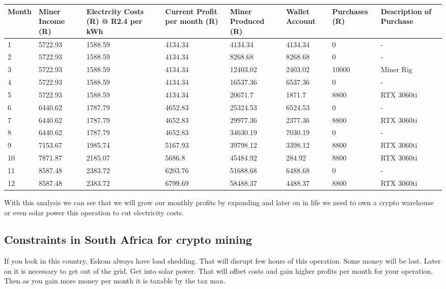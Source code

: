 \begin{table}[H]    
    \begin{tabular}{|p{1cm}|p{1.4cm}||p{1.3cm}||p{2cm}||p{2cm}||p{2cm}||p{2cm}||p{3cm}|}
    \hline
        Month & Miner Income (R) & Electrcity Costs (R) @ R2.4 per kWh & Current Profit per month (R) & Miner Produced (R) & Wallet Account & Purchases (R) & Description of Purchase \\ \hline
        1 & 5722.93 & 1588.59 & 4134.34 & 4134.34 & 4134.34 & 0 & - \\ \hline
        2 & 5722.93 & 1588.59 & 4134.34 & 8268.68 & 8268.68 & 0 & - \\ \hline
        3 & 5722.93 & 1588.59 & 4134.34 & 12403.02 & 2403.02 & 10000 & Miner Rig \\ \hline
        4 & 5722.93 & 1588.59 & 4134.34 & 16537.36 & 6537.36 & 0 & - \\ \hline
        5 & 5722.93 & 1588.59 & 4134.34 & 20671.7 & 1871.7 & 8800 & RTX 3060ti \\ \hline
        6 & 6440.62 & 1787.79 & 4652.83 & 25324.53 & 6524.53 & 0 & - \\ \hline
        7 & 6440.62 & 1787.79 & 4652.83 & 29977.36 & 2377.36 & 8800 & RTX 3060ti \\ \hline
        8 & 6440.62 & 1787.79 & 4652.83 & 34630.19 & 7030.19 & 0 & - \\ \hline
        9 & 7153.67 & 1985.74 & 5167.93 & 39798.12 & 3398.12 & 8800 & RTX 3060ti \\ \hline
        10 & 7871.87 & 2185.07 & 5686.8 & 45484.92 & 284.92 & 8800 & RTX 3060ti \\ \hline
        11 & 8587.48 & 2383.72 & 6203.76 & 51688.68 & 6488.68 & 0 & - \\ \hline
        12 & 8587.48 & 2383.72 & 6799.69 & 58488.37 & 4488.37 & 8800 & RTX 3060ti \\ \hline       
    \end{tabular}
\end{table}

With this analysis we can see that we will grow our monthly profits by expanding and later on in life we need to own a crypto warehouse or even solar power this operation to cut electricity costs.



\subsection{Constraints in South Africa for crypto mining}
If you look in this country, Eskom always have load shedding. That will disrupt few hours of this operation. Some money will be lost. Later on it is necessary to get out of the grid. Get into solar power. That will offset costs and gain higher profits per month for your operation. Then as you gain more money per month it is taxable by the tax man.

